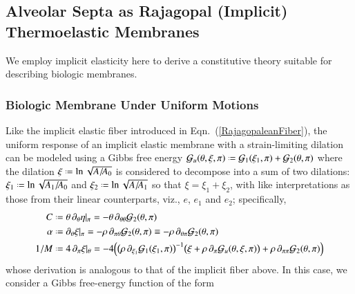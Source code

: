 \subsection{Alveolar Septa as Rajagopal (Implicit) Thermoelastic Membranes}

We employ implicit elasticity here to derive a constitutive theory suitable for describing biologic membranes.

\subsubsection{Biologic Membrane Under Uniform Motions}

Like the implicit elastic fiber introduced in Eqn.~(\ref{RajagopaleanFiber}), the uniform response of an implicit elastic membrane with a strain-limiting dilation can be modeled using a Gibbs free energy $\mathcal{G}_u (\theta , \xi , \pi ) \defeq \mathcal{G}_1 (\xi_1 ,\pi) + \mathcal{G}_2 (\theta , \pi)$ where the dilation $\xi \defeq \ln \sqrt{A / \! A_0}$ is considered to decompose into a sum of two dilations: $\xi_1 \defeq \ln \sqrt{A_1 / \! A_0}$ and $\xi_2 \defeq \ln \sqrt{A / \! A_1}$ so that $\xi = \xi_1 + \xi_2$, with like interpretations as those from their linear counterparts, viz., $e$, $e_1$ and $e_2$; specifically, 
\begin{subequations}
    \label{physicalFields2Dmembrane}
    \begin{align}
    C & \defeq \theta \, \partial_{\theta} \eta |_{\pi} = 
    -\theta \, \partial_{\theta\theta} \mathcal{G}_2(\theta , \pi)
    \label{specificHeat2Dmembrane} \\
    \alpha & \defeq \partial_{\theta} \xi |_{\pi} = 
    -\rho \, \partial_{\pi\theta} \mathcal{G}_2(\theta , \pi) \equiv
    -\rho \, \partial_{\theta\pi} \mathcal{G}_2(\theta , \pi)
    \label{thermalExpansion2Dmembrane} \\
    1/M & \defeq 4 \, \partial_{\pi} \xi |_{\theta} = -4 \Bigl(
    \bigl( \rho \, \partial_{\xi_1} \mathcal{G}_1 ( \xi_1, \pi ) \bigr)^{-1} 
    \bigl( \xi + \rho \, \partial_{\pi} \mathcal{G}_u (\theta , \xi , \pi ) \bigr) +
    \rho \, \partial_{\pi\pi} \mathcal{G}_2(\theta , \pi) \Bigr)
    \label{compliance2Dmembrane}
    \end{align}
\end{subequations}
whose derivation is analogous to that of the implicit fiber above.  In this case, we consider a Gibbs free-energy function of the form

